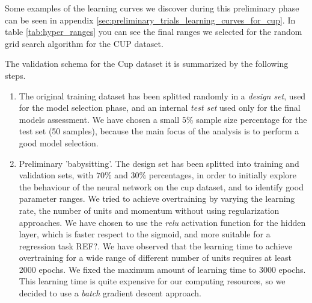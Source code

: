 \documentclass[11pt,twoside]{article}
\begin{document}
        Some examples of the learning curves we discover during this preliminary phase can be seen in appendix
        \ref{sec:preliminary_trials_learning_curves_for_cup}. In table \ref{tab:hyper_ranges} you can see the
        final ranges we selected for the random grid search algorithm for the CUP dataset.

\newpage
The validation schema for the Cup dataset it is summarized by the following steps.

\begin{enumerate}
\item The original training dataset has been splitted randomly in a \textit{design set}, used for the model selection phase, and an internal \textit{test set} used only for the final models assessment.
  We have chosen a small $5\%$ sample size percentage for the test set (50 samples), because the main focus of the analysis is to perform a good model selection. %
\item Preliminary 'babysitting'. The design set has been splitted into training and validation sets, with $70\%$ and $30\%$ percentages, in order to initially explore the behaviour of the neural network on the cup dataset, and to identify good parameter ranges. We tried to achieve overtraining by varying the learning rate, the number of units and momentum without using regularization approaches. We have chosen to use the \textit{relu} activation function for the hidden layer, which is faster respect to the sigmoid, and more suitable for a regression task REF?.
  We have observed that the learning time to achieve overtraining for a wide range of different number of units requires at least 2000 epochs. We fixed the maximum amount of learning time to 3000 epochs.
This learning time is quite expensive for our computing resources, so we decided to use a \textit{batch} gradient descent approach.


\end{enumerate}
\end{document}
